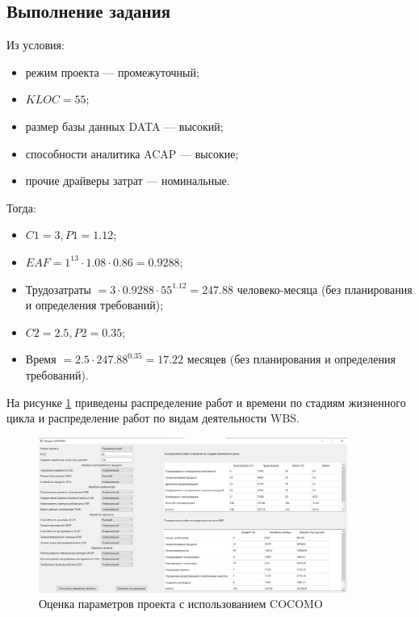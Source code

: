 \subsection{Выполнение задания} 

Из условия:

\begin{itemize}
	\item режим проекта --- промежуточный;
	\item $KLOC = 55$;
	\item размер базы данных DATA --- высокий;
	\item способности аналитика ACAP --- высокие;
	\item прочие драйверы затрат --- номинальные.
\end{itemize}

Тогда:

\begin{itemize}
	\item $C1 = 3, P1 = 1.12$;
	\item $EAF = 1^{13} \cdot 1.08 \cdot 0.86 = 0.9288$;
	\item $\text{Трудозатраты } = 3 \cdot 0.9288 \cdot 55^{1.12} = 247.88 \text{ человеко-месяца}$ (без планирования и определения требований);
	\item $C2 = 2.5, P2 = 0.35$;
	\item $\text{Время } = 2.5 \cdot 247.88^{0.35} = 17.22 \text{ месяцев}$  (без планирования и определения требований).
\end{itemize}

На рисунке \ref{fig:screen4} приведены распределение работ и времени по стадиям жизненного цикла и распределение работ по видам деятельности WBS.

\begin{figure}[H]
	\centering
	\includegraphics[width=0.9\textwidth]{img/task2_1.jpg}
	\caption{Оценка параметров проекта с использованием COCOMO}
	\label{fig:screen4}
\end{figure}

